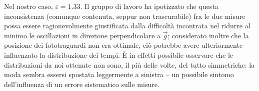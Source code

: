 \documentclass{article}
\begin{document}
Nel nostro caso, $\varepsilon = 1.33$. Il gruppo di lavoro ha ipotizzato che
questa inconsistenza (comunque contenuta, seppur non trascurabile) fra le due
misure possa essere ragionevolmente giustificata dalla difficoltà incontrata
nel ridurre al minimo le oscillazioni in direzione perpendicolare a $\vec{g}$;
considerato inoltre che la posizione dei fototraguardi non era ottimale, ciò
potrebbe avere ulteriormente influenzato la distribuzione dei tempi. È in
effetti possibile osservare che le distribuzioni da noi ottenute non sono,
il più delle volte, del tutto simmetriche: la moda sembra essersi spostata
leggermente a sinistra – un possibile sintomo dell'influenza di un
errore sistematico sulle misure.

\pagebreak
\end{document}
